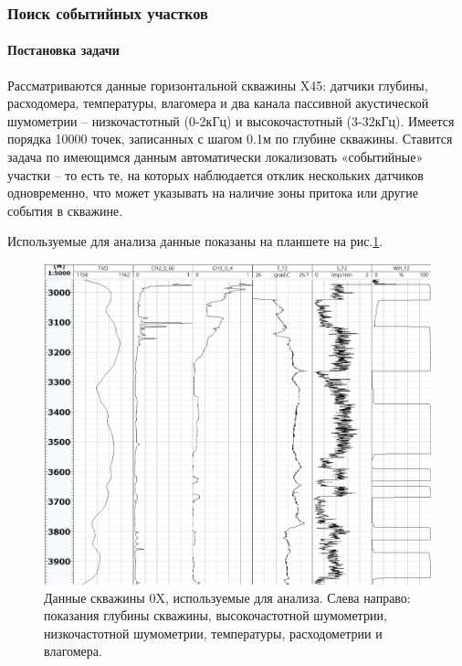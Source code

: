 \subsubsection{Поиск событийных участков}
\paragraph{Постановка задачи}
Рассматриваются данные горизонтальной скважины X45: датчики глубины, расходомера, температуры, влагомера и два канала пассивной акустической шумометрии – низкочастотный (0-2кГц) и высокочастотный (3-32кГц). Имеется порядка 10000 точек, записанных с шагом 0.1м по глубине скважины.
Ставится задача по имеющимся данным автоматически локализовать «событийные» участки – то есть те, на которых наблюдается отклик нескольких датчиков одновременно, что может указывать на наличие зоны притока или другие события в скважине.

Используемые для анализа данные показаны на планшете на рис.\ref{fig:data}.

\begin{figure}[H]
\centering
\includegraphics[width=1.0\textwidth]{WS/data.png}
\caption{Данные скважины 0X, используемые для анализа. Слева направо: показания глубины скважины, высокочастотной шумометрии, низкочастотной шумометрии, температуры, расходометрии и влагомера.}
\label{fig:data}
\end{figure}

